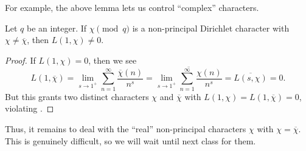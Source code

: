 \documentclass[../notes.tex]{subfiles}
\begin{document}
For example, the above lemma lets us control ``complex'' characters.
\begin{lemma}
	Let $q$ be an integer. If $\chi\pmod q$ is a non-principal Dirichlet character with $\chi\ne\overline\chi$, then $L(1,\chi)\ne0$.
\end{lemma}
\begin{proof}
	If $L(1,\chi)=0$, then we see
	\[L(1,\overline\chi)=\lim_{s\to1^+}\sum_{n=1}^\infty\frac{\overline\chi(n)}{n^s}=\overline{\lim_{s\to1^+}\sum_{n=1}^\infty\frac{\chi(n)}{n^s}}=\overline{L(s,\chi)}=0.\]
	But this grants two distinct characters $\chi$ and $\overline\chi$ with $L(1,\chi)=L(1,\overline\chi)=0$, violating .
\end{proof}
Thus, it remains to deal with the ``real'' non-principal characters $\chi$ with $\chi=\overline\chi$. This is genuinely difficult, so we will wait until next class for them.
\end{document}
